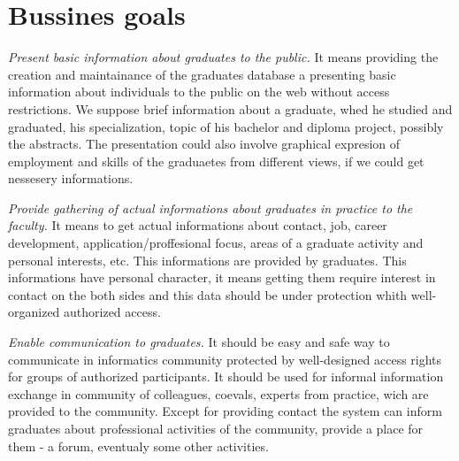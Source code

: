 \documentclass{iitsrc}[2006/14/02]
\begin{document}

\section{Bussines goals}

{\em Present basic information about graduates to the public.}
It means providing the creation and maintainance  of the graduates database a presenting basic information about individuals to the public on the web without access restrictions. We suppose brief information about a graduate, whed he studied and graduated, his specialization, topic of his bachelor and diploma project, possibly the abstracts. The presentation could also involve graphical expresion of employment and skills of the graduaetes from different views, if we could get nessesery informations.

{\em Provide gathering of actual informations about graduates in practice to the faculty.} 
It means to get actual informations about contact, job, career development, application/proffesional focus, areas of a graduate activity and personal interests, etc. This informations are provided by graduates. This informations have personal character, it means getting them require interest in contact on the both sides and this data should be under protection whith well-organized authorized access.

{\em Enable communication to graduates.}
It should be easy and safe way to communicate in informatics community protected by well-designed access rights for groups of authorized participants. It should be used for informal information exchange in community of colleagues, coevals, experts from practice, wich are provided to the community. Except for providing contact the system can inform graduates about professional activities of the community, provide a place for them - a forum, eventualy some other activities.
\end{document}
